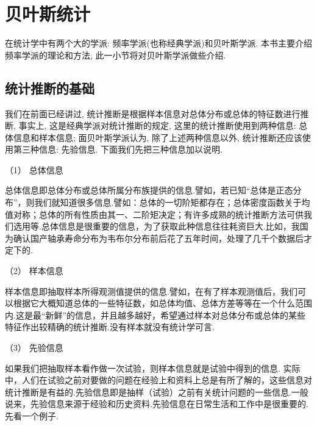 \section{贝叶斯统计}\label{sec:6.4}

在统计学中有两个大的学派: 频率学派(也称经典学派)和贝叶斯学派. 本书主要介绍频率学派的理论和方法, 此一小节将对贝叶斯学派做些介绍.

\subsection{统计推断的基础}\label{ssec:6.4.1}

我们在前面已经讲过, 统计推断是根据样本信息对总体分布或总体的特征数进行推断, 事实上, 这是经典学派对统计推断的规定, 这里的统计推断使用到两种信息: {\heiti 总体信息}和{\heiti 样本信息}; 面贝叶斯学派认为, 除了上述两种信息以外, 统计推断还应该使用第三种信息: {\heiti 先验信息}. 下面我们先把三种信息加以说明.

  （1） 总体信息

总体信息即总体分布或总体所属分布族提供的信息.譬如，若已知“总体是正态分布”，则我们就知道很多信息.譬如：总体的一切阶矩都存在；总体密度函数关于均值对称；总体的所有性质由其一、二阶矩决定；有许多成熟的统计推断方法可供我们选用等.总体信息是很重要的信息，为了获取此种信息往往耗资巨大.比如，我国为确认国产轴承寿命分布为韦布尔分布前后花了五年时间，处理了几千个数据后才定下的.

  （2） 样本信息

样本信息即抽取样本所得观测值提供的信息.譬如，在有了样本观测值后，我们可以根据它大概知道总体的一些特征数，如总体均值、总体方差等等在一个什么范围内.这是最“新鲜”的信息，并且越多越好，希望通过样本对总体分布或总体的某些特征作出较精确的统计推断.没有样本就没有统计学可言.

  （3） 先验信息

如果我们把抽取样本看作做一次试验，则样本信息就是试验中得到的信息.
实际中，人们在试验之前对要做的问题在经验上和资料上总是有所了解的，这些信息对统计推断是有益的.先验信息即是抽样（试验）之前有关统计问题的一些信息.一般说来，先验信息来源于经验和历史资料.先验信息在日常生活和工作中是很重要的.先看一个例子.

